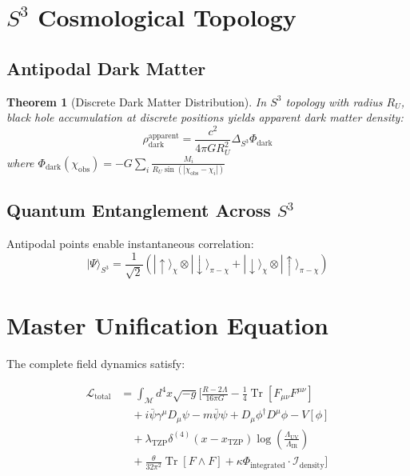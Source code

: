\documentclass[11pt,a4paper]{article}
\newtheorem{theorem}{Theorem}
\DeclareMathOperator{\Tr}{Tr}
\DeclareMathOperator{\TZP}{TZP}
\begin{document}
\section{$S^3$ Cosmological Topology}


\subsection{Antipodal Dark Matter}


\begin{theorem}[Discrete Dark Matter Distribution]
In $S^3$ topology with radius $R_U$, black hole accumulation at discrete positions yields apparent dark matter density:
\begin{equation}
\rho_{\text{dark}}^{\text{apparent}} = \frac{c^2}{4\pi GR_U^2} \Delta_{S^3}\Phi_{\text{dark}}
\end{equation}
where $\Phi_{\text{dark}}(\chi_{\text{obs}}) = -G\sum_i \frac{M_i}{R_U\sin(|\chi_{\text{obs}} - \chi_i|)}$
\end{theorem}


\subsection{Quantum Entanglement Across $S^3$}


Antipodal points enable instantaneous correlation:
\begin{equation}
|\Psi\rangle_{S^3} = \frac{1}{\sqrt{2}}\left(|\uparrow\rangle_\chi \otimes |\downarrow\rangle_{\pi-\chi} + |\downarrow\rangle_\chi \otimes |\uparrow\rangle_{\pi-\chi}\right)
\end{equation}


\section{Master Unification Equation}


The complete field dynamics satisfy:


\begin{align}
\mathcal{L}_{\text{total}} &= \int_{\mathcal{M}} d^4x \sqrt{-g} \Bigg[ \frac{R-2\Lambda}{16\pi G} - \frac{1}{4}\Tr[F_{\mu\nu}F^{\mu\nu}] \\
&\quad + i\bar{\psi}\gamma^\mu D_\mu\psi - m\bar{\psi}\psi + D_\mu\phi^\dagger D^\mu\phi - V[\phi] \\
&\quad + \lambda_{\TZP}\delta^{(4)}(x-x_{\TZP})\log\left(\frac{\Lambda_{\text{UV}}}{\Lambda_{\text{IR}}}\right) \\
&\quad + \frac{\theta}{32\pi^2}\Tr[F \wedge F] + \kappa\Phi_{\text{integrated}} \cdot \mathcal{I}_{\text{density}} \Bigg]
\end{align}
\end{document}
